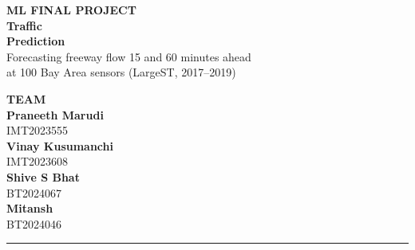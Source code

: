 \documentclass[11pt,a4paper]{article}
\begin{document}
\thispagestyle{empty}
\noindent
\begin{minipage}[t]{0.58\linewidth}
{\small\bfseries\color{accent}\MakeUppercase{ML Final Project}}\\[6pt]
{\fontsize{30}{34}\selectfont\bfseries\color{ink} Traffic\\[-2pt] Prediction}\\[8pt]
{\large\color{mute} Forecasting freeway flow 15 and 60 minutes ahead\\ at 100 Bay Area sensors (LargeST, 2017--2019)}
\end{minipage}\hfill
\begin{minipage}[t]{0.36\linewidth}\raggedleft
{\small\bfseries\color{accent}\MakeUppercase{Team}}\\[6pt]
\textbf{Praneeth Marudi}\\[-1pt]{\small IMT2023555}\\[5pt]
\textbf{Vinay Kusumanchi}\\[-1pt]{\small IMT2023608}\\[5pt]
\textbf{Shive S Bhat}\\[-1pt]{\small BT2024067}\\[5pt]
\textbf{Mitansh}\\[-1pt]{\small BT2024046}
\end{minipage}

\vspace{6pt}
{\color{accent}\rule{\linewidth}{1.2pt}}
\vspace{8pt}

\end{document}
